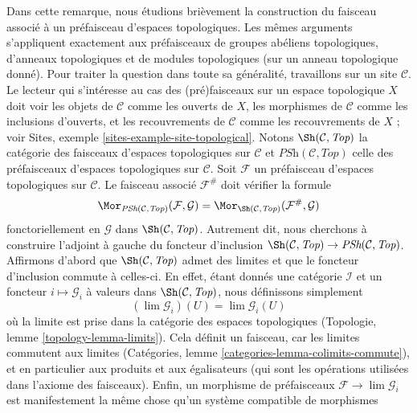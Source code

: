 \begin{remark}
\label{remark-sheafification-of-presheaves-in-top}
\begin{reference}
\cite{Gray}
\end{reference}
Dans cette remarque, nous étudions brièvement la construction du faisceau associé à un préfaisceau
d'espaces topologiques. Les mêmes arguments s'appliquent exactement aux
préfaisceaux de groupes abéliens topologiques, d'anneaux topologiques et de
modules topologiques (sur un anneau topologique donné). Pour traiter
la question dans toute sa généralité, travaillons sur un site
$\mathcal{C}$. Le lecteur qui s'intéresse au cas des (pré)faisceaux
sur un espace topologique $X$ doit voir les objets de $\mathcal{C}$
comme les ouverts de $X$, les morphismes de $\mathcal{C}$ comme les inclusions
d'ouverts, et les recouvrements de $\mathcal{C}$ comme les recouvrements de $X$ ; voir
Sites, exemple \ref{sites-example-site-topological}.
Notons $\Sh(\mathcal{C}, \textit{Top})$ la catégorie des faisceaux
d'espaces topologiques sur $\mathcal{C}$ et
$\textit{PSh}(\mathcal{C}, \textit{Top})$ celle des préfaisceaux
d'espaces topologiques sur $\mathcal{C}$.
Soit $\mathcal{F}$ un préfaisceau d'espaces topologiques sur $\mathcal{C}$.
Le faisceau associé $\mathcal{F}^\#$ doit vérifier la formule
$$
\Mor_{\textit{PSh}(\mathcal{C}, \textit{Top})}(\mathcal{F}, \mathcal{G})
=
\Mor_{\Sh(\mathcal{C}, \textit{Top})}(\mathcal{F}^\#, \mathcal{G})
$$
fonctoriellement en $\mathcal{G}$ dans $\Sh(\mathcal{C}, \textit{Top})$.
Autrement dit, nous cherchons à construire l'adjoint à gauche
du foncteur d'inclusion
$\Sh(\mathcal{C}, \textit{Top}) \to \textit{PSh}(\mathcal{C}, \textit{Top})$.
Affirmons d'abord que $\Sh(\mathcal{C}, \textit{Top})$ admet des limites
et que le foncteur d'inclusion commute à celles-ci.
En effet, étant donnés une catégorie $\mathcal{I}$ et un foncteur
$i \mapsto \mathcal{G}_i$ à valeurs dans $\Sh(\mathcal{C}, \textit{Top})$,
nous définissons simplement
$$
(\lim \mathcal{G}_i)(U) = \lim \mathcal{G}_i(U)
$$
où la limite est prise dans la catégorie des espaces topologiques
(Topologie, lemme \ref{topology-lemma-limits}). Cela définit un faisceau,
car les limites commutent aux limites
(Catégories, lemme \ref{categories-lemma-colimits-commute}),
et en particulier aux produits et aux égalisateurs (qui sont les
opérations utilisées dans l'axiome des faisceaux). Enfin, un morphisme
de préfaisceaux $\mathcal{F} \to \lim \mathcal{G}_i$ est
manifestement la même chose qu'un système compatible de morphismes

\end{remark}

